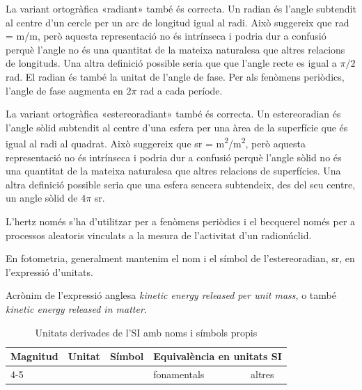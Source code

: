 \begin{ThreePartTable}
\begin{TableNotes}
    \item[\color{blue}(a)] {\footnotesize La variant ortogràfica «radiant» també és correcta. Un radian és   l'angle subtendit al centre d'un cercle per un arc de longitud igual al radi. Això suggereix que rad = m/m, però aquesta representació no és  intrínseca i podria dur a confusió perquè l'angle no és  una quantitat de la mateixa naturalesa que altres relacions de longituds. Una altra definició possible seria que que l'angle recte es igual a $\pi/2$ rad. El radian és també la unitat de l'angle de fase. Per als fenòmens periòdics, l'angle de fase augmenta en $2 \pi$ rad a cada període.}
    \item[\color{blue}(b)] {\footnotesize La variant ortogràfica «estereoradiant» també és correcta. Un estereoradian és l'angle sòlid subtendit al centre d'una esfera per una àrea de la superfície que és igual al radi al quadrat. Això suggereix que sr = \unit{m^2/m^2}, però aquesta representació no és intrínseca i podria dur a confusió perquè l'angle sòlid no és una quantitat de la mateixa naturalesa que altres relacions de superfícies. Una altra definició possible seria que una esfera sencera subtendeix, des del seu centre, un angle sòlid de $4 \pi$  sr.}
    \item[\color{blue}(c)] {\footnotesize L'hertz només s'ha d'utilitzar per a fenòmens periòdics i el becquerel només per a  processos aleatoris vinculats a la mesura de l'activitat d'un radionúclid.}
     \item[\color{blue}(d)] {\footnotesize En fotometria, generalment mantenim el nom i el símbol de l'estereoradian, sr, en l'expressió d'unitats.}
    \item[\color{blue}(e)] {\footnotesize Acrònim de l'expressió anglesa \textit{kinetic energy released  per unit mass}, o també \textit{kinetic energy released in matter}.}
\end{TableNotes}
\begin{longtable}[h]{llclc}
   \caption{\label{taula:SI-derivades} Unitats derivades de
   l'SI amb noms i símbols propis}\\
   \toprule[1pt]
    \multirow{2}{15mm}{\rule{0mm}{6mm}Magnitud} & \multirow{2}{15mm}{\rule{0mm}{6mm}Unitat}  &
    \multirow{2}{15mm}{\rule{0mm}{6mm}Símbol}  & \multicolumn{2}{c}{Equivalència en unitats SI}\\
    \cmidrule(rl){4-5}
    &  &   & fonamentals & altres\\

\end{longtable}
\end{ThreePartTable}
